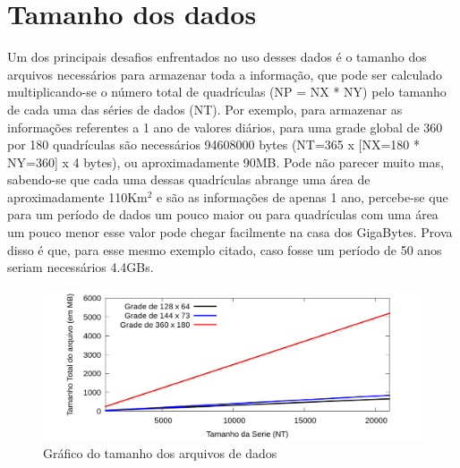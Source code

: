 \section{Tamanho dos dados}

Um dos principais desafios enfrentados no uso desses dados é o tamanho dos arquivos necessários para armazenar toda a informação, que pode ser calculado multiplicando-se o número total de quadrículas (NP = NX * NY) pelo tamanho de cada uma das séries de dados (NT). Por exemplo, para armazenar as informações referentes a 1 ano de valores diários, para uma grade global de 360 por 180 quadrículas são necessários 94608000 bytes (NT=365 x [NX=180 * NY=360] x 4 bytes), ou aproximadamente 90MB. Pode não parecer muito mas, sabendo-se que cada uma dessas quadrículas abrange uma área de aproximadamente 110Km$^2$ e são as informações de apenas 1 ano, percebe-se que para um período de dados um pouco maior ou para quadrículas com uma área um pouco menor esse valor pode chegar facilmente na casa dos GigaBytes. Prova disso é que, para esse mesmo exemplo citado, caso fosse um período de 50 anos seriam necessários 4.4GBs.

\begin{figure}[H]
\centering
\includegraphics[width=1.0\textwidth]{Imagens/tamanho_dados/serie_tam_dados.png}
\caption{Gráfico do tamanho dos arquivos de dados}
\label{fig:grafico_tamanho_dados}
\end{figure}
